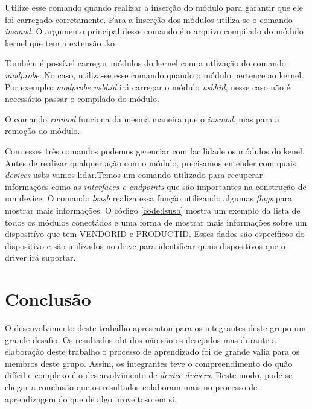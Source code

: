 \lstset{style=terminal}


Utilize esse comando quando realizar a inserção do módulo para garantir que ele foi carregado
corretamente. Para a inserção dos módulos utiliza-se o comando \textit{insmod}. O argumento principal desse
comando é o arquivo compilado do módulo kernel que tem a extensão .ko.

\lstset{style=terminal}


Também é possível carregar módulos do kernel com a utlização do comando \textit{modprobe}. No caso, utiliza-se
esse comando quando o módulo pertence ao kernel. Por exemplo: \textit{modprobe usbhid} irá carregar o módulo
\textit{usbhid}, nesse caso não é necessário passar o compilado do módulo.

O comando \textit{rmmod} funciona da mesma maneira que o \textit{insmod}, mas para a remoção do módulo.

\lstset{style=terminal}


Com esses três comandos podemos gerenciar com facilidade os módulos do kenel.
Antes de realizar qualquer ação com o módulo, precisamos entender com quais \textit{devices} usbs vamos
lidar.Temos um comando utilizado para recuperar
informações como as \textit{interfaces e endpoints} que são importantes na construção de um device.
O comando \textit{lsusb} realiza essa função utilizando algumas \textit{flags} para mostrar mais informações.
O código \ref{code:lsusb} mostra um exemplo da lista de todos os módulos conectádos e uma
forma de mostrar mais informações sobre um dispositívo que tem VENDORID e PRODUCTID. Esses
dados são específicos do dispositivo e são utilizados no drive para identificar quais
dispositívos que o driver irá suportar.

\lstset{style=terminal}





\section{Conclusão}
O desenvolvimento deste trabalho apresentou para os integrantes deste grupo um grande desafio. Os resultados obtidos não são os desejados
mas durante a elaboração deste trabalho o processo de aprendizado foi de grande valia para os membros deste grupo. Assim, os integrantes teve o compreendimento
do quão difícil e complexo é o desenvolvimento de \textit{device drivers}. Deste modo, pode se chegar a conclusão que os resultados colaboram mais no processo de aprendizagem do que de algo proveitoso em si. 

